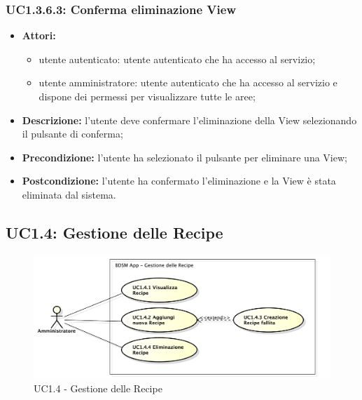 \subsubsection{UC1.3.6.3: Conferma eliminazione View}

\begin{itemize}
   	\item \textbf{Attori:}
    \begin{itemize}
    	\item utente autenticato: utente autenticato che ha accesso al servizio;
    	\item utente amministratore: utente autenticato che ha accesso al servizio e dispone dei permessi per visualizzare tutte le aree;
	\end{itemize}
    \item \textbf{Descrizione:} l'utente deve confermare l'eliminazione della View\gloss{} selezionando il pulsante di conferma;
    \item \textbf{Precondizione:} l'utente ha selezionato il pulsante per eliminare una View\gloss{};
    \item \textbf{Postcondizione:} l'utente ha confermato l'eliminazione e la View\gloss{} è stata eliminata dal sistema.
\end{itemize}

\pagebreak


\subsection{UC1.4: Gestione delle Recipe}

\begin{figure}[!ht]
    \centering
    \centerline{\includegraphics[scale=0.45]{./images/UC1_4.pdf}}
    \caption{UC1.4 - Gestione delle Recipe}
\end{figure}

